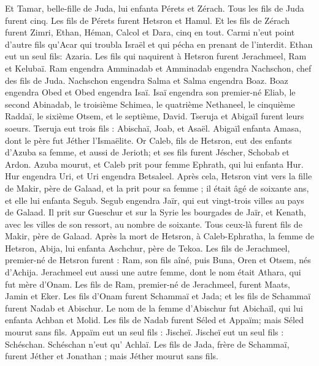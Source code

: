 \begin{multicols}{2}
Et Tamar, belle-fille de Juda, lui enfanta Pérets et Zérach. Tous les fils de Juda furent cinq.
Les fils de Pérets furent Hetsron et Hamul.
Et les fils de Zérach furent Zimri, Ethan, Héman, Calcol et Dara, cinq en tout.
Carmi n'eut point d’autre fils qu'Acar qui troubla Israël et qui pécha en prenant de l'interdit.
Ethan eut un seul fils: Azaria.
Les fils qui naquirent à Hetsron furent Jerachmeel, Ram et Kelubaï.
Ram engendra Amminadab et Amminadab engendra Nachschon, chef des fils de Juda.
Nachschon engendra Salma et Salma engendra Boaz.
Boaz engendra Obed et Obed engendra Isaï.
Isaï engendra son premier-né Eliab, le second Abinadab, le troisième Schimea,
le quatrième Nethaneel, le cinquième Raddaï,
le sixième Otsem, et le septième, David.
Tseruja et Abigaïl furent leurs soeurs. Tseruja eut trois fils : Abischaï, Joab, et Asaël.
Abigaïl enfanta Amasa, dont le père fut Jéther l’Ismaëlite.
Or Caleb, fils de Hetsron, eut des enfants d’Azuba sa femme, et aussi de Jerioth; et ses fils furent Jéscher, Schobab et Ardon.
Azuba mourut, et Caleb prit pour femme Ephrath, qui lui enfanta Hur.
Hur engendra Uri, et Uri engendra Betsaleel.
Après cela, Hetsron vint vers la fille de Makir, père de Galaad, et la prit pour sa femme ; il était âgé de soixante ans, et elle lui enfanta Segub.
Segub engendra Jaïr, qui eut vingt-trois villes au pays de Galaad.
Il prit sur Gueschur et sur la Syrie les bourgades de Jaïr, et Kenath, avec les villes de son ressort, au nombre de soixante. Tous ceux-là furent fils de Makir, père de Galaad.
Après la mort de Hetsron, à Caleb-Ephratha, la femme de Hetsron, Abija, lui enfanta Aschchur, père de Tekoa.
Les fils de Jerachmeel, premier-né de Hetsron furent : Ram, son fils aîné, puis Buna, Oren et Otsem, nés d'Achija.
Jerachmeel eut aussi une autre femme, dont le nom était Athara, qui fut mère d'Onam.
Les fils de Ram, premier-né de Jerachmeel, furent Maats, Jamin et Eker.
Les fils  d'Onam furent  Schammaï et Jada; et les fils de Schammaï furent  Nadab et Abischur.
Le nom de la femme d'Abischur fut Abichaïl, qui lui enfanta Achban et Molid.
Les fils de Nadab furent Séled et Appaïm; mais Séled mourut sans fils.
Appaïm eut un seul fils : Jischeï. Jischeï eut un seul fils : Schéschan. Schéschan n'eut qu' Achlaï.
Les fils de Jada, frère de Schammaï, furent Jéther et Jonathan ; mais Jéther mourut sans fils.

\end{multicols}
